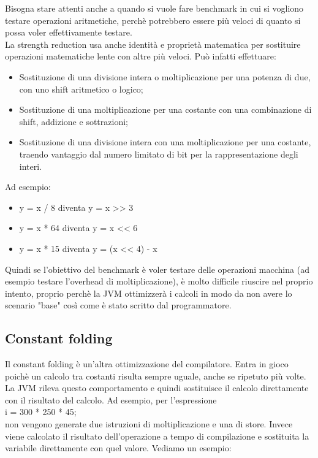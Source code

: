 \documentclass[a4paper, 11pt,            %
openright,               %
italian,
english                 
]{article}       %
\begin{document}
	Bisogna stare attenti anche a quando si vuole fare benchmark in cui si vogliono testare operazioni aritmetiche, perchè potrebbero essere più veloci di quanto si possa voler effettivamente testare.\\
	La strength reduction usa anche identità e proprietà matematica per sostituire operazioni matematiche lente con altre più veloci. Può infatti effettuare:
	\begin{itemize}
		\item Sostituzione di una divisione intera o moltiplicazione per una potenza di due, con uno shift aritmetico o logico;
		\item Sostituzione di una moltiplicazione per una costante con una combinazione di shift, addizione e sottrazioni;
		\item Sostituzione di una divisione intera con una moltiplicazione per una costante, traendo vantaggio dal numero limitato di bit per la rappresentazione degli interi.
	\end{itemize}
	
	Ad esempio:
	\begin{itemize}
		\item y = x / 8 diventa y = x >> 3
		\item y = x * 64 diventa y = x << 6
		\item y = x * 15 diventa y = (x << 4) - x
	\end{itemize}
	
	Quindi se l'obiettivo del benchmark è voler testare delle operazioni macchina (ad esempio testare l'overhead di moltiplicazione), è molto difficile riuscire nel proprio intento, proprio perchè la JVM ottimizzerà i calcoli in modo da non avere lo scenario "base" così come è stato scritto dal programmatore. 
	
	
	\subsection{Constant folding}
	
	Il constant folding è un'altra ottimizzazione del compilatore. Entra in gioco poichè un calcolo tra costanti risulta sempre uguale, anche se ripetuto più volte. La JVM rileva questo comportamento e quindi sostituisce il calcolo direttamente con il risultato del calcolo. Ad esempio, per l'espressione\\ 
	i = 300 * 250 * 45;\\ 
	non vengono generate due istruzioni di moltiplicazione e una di store. Invece viene calcolato il risultato dell'operazione a tempo di compilazione e sostituita la variabile direttamente con quel valore.
	Vediamo un esempio:
	
\end{document}
